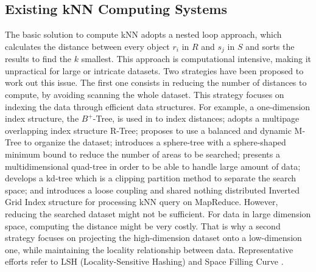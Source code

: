 \subsection{Existing kNN Computing Systems}
The basic solution to compute kNN adopts a nested loop approach, which calculates the distance between every object 
$r_i$ in $R$ and $s_j$ in $S$ and 
sorts the results to find the $k$ smallest. This approach is computational intensive, making it unpractical for large or intricate datasets. Two
strategies have been proposed to work out this issue.  
The first one consists in reducing the number of distances to compute, by avoiding scanning the whole dataset. This strategy focuses on indexing the 
data through efficient data structures. For example, a one-dimension index structure, the $B^+$-Tree, is used in \cite{DBLP:journals/tods/JagadishOTYZ05} to index distances; 
\cite{MuX} adopts a multipage overlapping index structure R-Tree; 
\cite{Ciaccia:1997:MEA:645923.671005} 
proposes to use a balanced and dynamic M-Tree to organize the dataset; \cite{Yu:2010:HKJ:1713160.1713227} introduces a sphere-tree with a sphere-shaped minimum bound to reduce the number of areas to be searched; \cite{Andreica13sequentialand} presents a multidimensional quad-tree in order to be able to handle large 
amount of data; \cite{Bentley:1975:MBS:361002.361007} develops a kd-tree which is a  clipping partition method to separate the search space; %
and \cite{Ji:2012:IGK:2408853.2408998} introduces a loose coupling and shared nothing distributed Inverted Grid Index 
structure for processing kNN query on MapReduce. 
However, reducing the searched dataset might not be sufficient. For data in large dimension space, computing the distance might 
be very costly. That is why a second strategy focuses on projecting the high-dimension dataset onto a low-dimension one, while maintaining the 
locality relationship between data. Representative efforts refer to LSH (Locality-Sensitive Hashing) \cite{DBLP:conf/compgeom/2004} and 
Space  Filling Curve \cite{5447837}.

